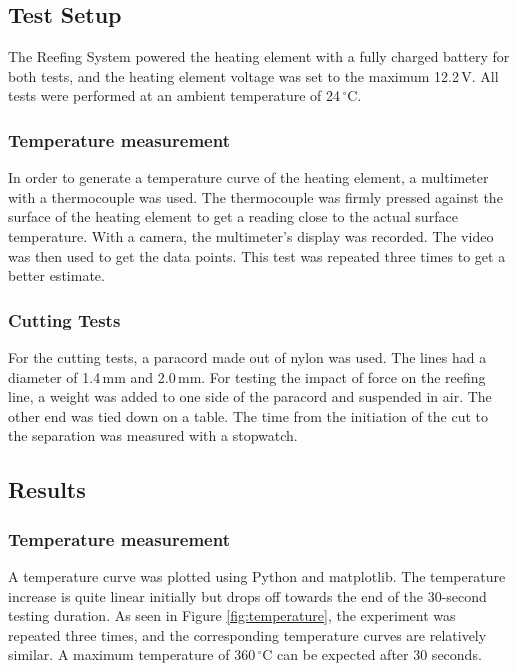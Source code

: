 \subsection{Test Setup}
The Reefing System powered the heating element with a fully charged battery for both tests, and the heating element voltage was set to the maximum 12.2\,V. All tests were performed at an ambient temperature of 24\,$^\circ$C.

\subsubsection{Temperature measurement}
In order to generate a temperature curve of the heating element, a multimeter with a thermocouple was used. The thermocouple was firmly pressed against the surface of the heating element to get a reading close to the actual surface temperature. With a camera, the multimeter's display was recorded. The video was then used to get the data points. This test was repeated three times to get a better estimate. 

\subsubsection{Cutting Tests}
For the cutting tests, a paracord made out of nylon was used. The lines had a diameter of 1.4\,mm and 2.0\,mm. For testing the impact of force on the reefing line, a weight was added to one side of the paracord and suspended in air. The other end was tied down on a table. The time from the initiation of the cut to the separation was measured with a stopwatch. 

\subsection{Results}
\subsubsection{Temperature measurement}
A temperature curve was plotted using Python and matplotlib. The temperature increase is quite linear initially but drops off towards the end of the 30-second testing duration. As seen in Figure \ref{fig:temperature}, the experiment was repeated three times, and the corresponding temperature curves are relatively similar. A maximum temperature of 360\,$^\circ$C can be expected after 30 seconds.

